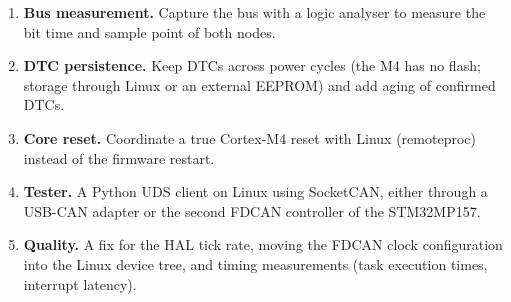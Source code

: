 \begin{enumerate}
  \item \textbf{Bus measurement.} Capture the bus with a logic analyser to measure the bit time and sample point of both nodes.
  \item \textbf{DTC persistence.} Keep DTCs across power cycles (the M4 has no flash; storage through Linux or an external EEPROM) and add aging of confirmed DTCs.
  \item \textbf{Core reset.} Coordinate a true Cortex-M4 reset with Linux (remoteproc) instead of the firmware restart.
  \item \textbf{Tester.} A Python UDS client on Linux using SocketCAN, either through a USB-CAN adapter or the second FDCAN controller of the STM32MP157.
  \item \textbf{Quality.} A fix for the HAL tick rate, moving the FDCAN clock configuration into the Linux device tree, and timing measurements (task execution times, interrupt latency).
\end{enumerate}
